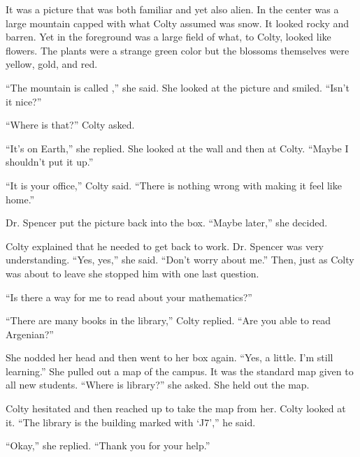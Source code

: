 It was a picture that was both familiar and yet also alien. In the center was a large mountain
capped with what Colty assumed was snow. It looked rocky and barren. Yet in the foreground was a
large field of what, to Colty, looked like flowers. The plants were a strange green color but
the blossoms themselves were yellow, gold, and red.

``The mountain is called ,'' she said. She looked at the picture and smiled.
``Isn't it nice?''

``Where is that?'' Colty asked.

``It's on Earth,'' she replied. She looked at the wall and then at Colty. ``Maybe I shouldn't
put it up.''

``It is your office,'' Colty said. ``There is nothing wrong with making it feel like home.''

Dr. Spencer put the picture back into the box. ``Maybe later,'' she decided.

Colty explained that he needed to get back to work. Dr. Spencer was very understanding. ``Yes,
yes,'' she said. ``Don't worry about me.'' Then, just as Colty was about to leave she stopped
him with one last question.

``Is there a way for me to read about your mathematics?''

``There are many books in the library,'' Colty replied. ``Are you able to read Argenian?''

She nodded her head and then went to her box again. ``Yes, a little. I'm still learning.'' She
pulled out a map of the campus. It was the standard map given to all new students. ``Where is
library?'' she asked. She held out the map.

Colty hesitated and then reached up to take the map from her. Colty looked at it. ``The library
is the building marked with `J7','' he said.

``Okay,'' she replied. ``Thank you for your help.''


